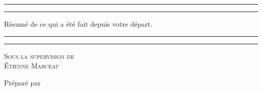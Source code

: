 \documentclass{article}
\begin{document}
	\renewcommand{\tablename}{Tableau}
	\renewcommand{\figurename}{Illustration}
	
	\begin{titlepage}
		\centering %
		
		\scshape %
		
		\vspace*{7\baselineskip} %
		
		
		\rule{\textwidth}{1.6pt}\vspace*{-\baselineskip}\vspace*{2pt} %
		\rule{\textwidth}{0.4pt} %
		
		\vspace{0.75\baselineskip} %
		{\LARGE Résumé de ce qui a été fait depuis votre départ. \\} %
		\vspace{0.75\baselineskip} %
		
		\rule{\textwidth}{0.4pt}\vspace*{-\baselineskip}\vspace{3.2pt} %
		\rule{\textwidth}{1.6pt} %
		
		\vspace{3\baselineskip} %
		
		{\scshape\Large Sous la supervision de \\Étienne Marceau\\} %
		
		\vspace*{3\baselineskip}
		
		
		\vspace*{3\baselineskip} %
		
		
		Préparé par
		
		\vspace{0.5\baselineskip} %
		

\end{titlepage}
\end{document}
